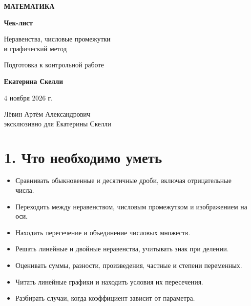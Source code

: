 \documentclass[a4paper,12pt]{article}
\newcommand{\chap}[1]{\needspace{7\baselineskip}\section*{\color{darkaccent}#1}}
\begin{document}
\thispagestyle{empty}
\begin{center}
\vspace*{27mm}
{\large\color{accent}\textbf{МАТЕМАТИКА}}\par
\vspace{28mm}
{\fontsize{28}{34}\selectfont\color{darkaccent}\textbf{Чек-лист}}\par
\vspace{9mm}
{\Large Неравенства, числовые промежутки\\[2mm]и графический метод}\par
\vspace{12mm}
{\normalsize Подготовка к контрольной работе}\par
\vspace{25mm}
{\large\textbf{Екатерина Скелли}}\par
\vspace{5mm}
4 ноября 2026 г.
\end{center}
\vfill
\begin{center}
{\small Лёвин Артём Александрович}\\[2pt]
{\small эксклюзивно для Екатерины Скелли}
\end{center}
\vspace{10mm}
\begin{center}
\end{center}
\clearpage

\chap{1. Что необходимо уметь}
\begin{itemize}[label=$\square$]
\item Сравнивать обыкновенные и десятичные дроби, включая отрицательные числа.
\item Переходить между неравенством, числовым промежутком и изображением на оси.
\item Находить пересечение и объединение числовых множеств.
\item Решать линейные и двойные неравенства, учитывать знак при делении.
\item Оценивать суммы, разности, произведения, частные и степени переменных.
\item Читать линейные графики и находить условия их пересечения.
\item Разбирать случаи, когда коэффициент зависит от параметра.
\end{itemize}
\end{document}
